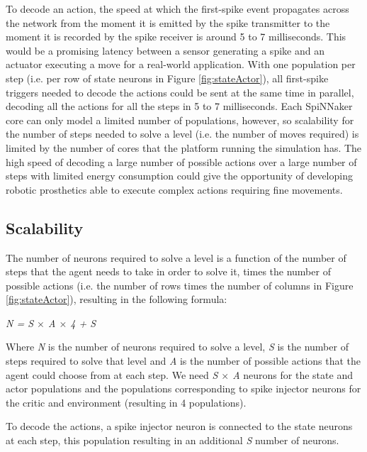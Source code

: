 \documentclass[10pt]{article}
\begin{document}
    To decode an action, the speed at which the first-spike event propagates across the network from the moment it is emitted by the spike transmitter to the moment it is recorded by the spike receiver is around 5 to 7 milliseconds. This would be a promising latency between a sensor generating a spike and an actuator executing a move for a real-world application.  With one population per step (i.e. per row of state neurons in Figure \ref{fig:stateActor}), all first-spike triggers needed to decode the actions could be sent at the same time in parallel, decoding all the actions for all the steps in 5 to 7 milliseconds. Each SpiNNaker core can only model a limited number of populations, however, so scalability for the number of steps needed to solve a level (i.e. the number of moves required) is limited by the number of cores that the platform running the simulation has. The high speed of decoding a large number of possible actions over a large number of steps with limited energy consumption could give the opportunity of developing robotic prosthetics able to execute complex actions requiring fine movements.

    \subsection{Scalability}

    The number of neurons required to solve a level is a function of the number of steps that the agent needs to take in order to solve it, times the number of possible actions (i.e. the number of rows times the number of columns in Figure \ref{fig:stateActor}), resulting in the following formula:

    \begin{center}
        \textit{N = S $\times$ A $\times$ 4 + S}
    \end{center}

    Where \textit{N} is the number of neurons required to solve a level, \textit{S} is the number of steps required to solve that level and \textit{A} is the number of possible actions that the agent could choose from at each step. We need \textit{S $\times$ A} neurons for the state and actor populations and the populations corresponding to spike injector neurons for the critic and environment (resulting in 4 populations). 
    
    To decode the actions, a spike injector neuron is connected to the state neurons at each step, this population resulting in an additional \textit{S} number of neurons.
\end{document}
